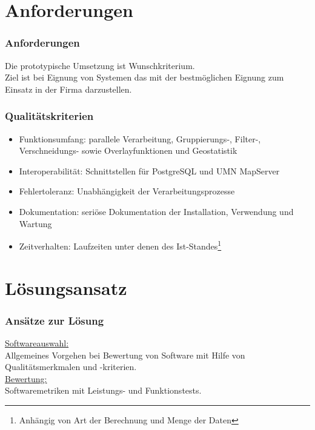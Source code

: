 \documentclass{beamer}
\begin{document}
% 

\section{Anforderungen}
\begin{frame}\frametitle{Anforderungen}
Die prototypische Umsetzung ist Wunschkriterium.\\ %
Ziel ist bei Eignung von Systemen das mit der bestmöglichen Eignung zum Einsatz in der Firma darzustellen.
\end{frame}

\begin{frame}\frametitle{Qualitätskriterien}
\begin{itemize}
\item Funktionsumfang: parallele Verarbeitung, Gruppierungs-, Filter-, Verschneidungs- sowie Overlayfunktionen und Geostatistik
\item Interoperabilität: Schnittstellen für PostgreSQL und UMN MapServer
\item Fehlertoleranz: Unabhängigkeit der Verarbeitungsprozesse
\item Dokumentation: seriöse Dokumentation der Installation, Verwendung und Wartung
\item Zeitverhalten: Laufzeiten unter denen des Ist-Standes\footnote{Anhängig von Art der Berechnung und Menge der Daten}
\end{itemize}
\end{frame}

\section{Lösungsansatz}


\begin{frame}\frametitle{Ansätze zur Lösung}
\underline{Softwareauswahl:}\\
Allgemeines Vorgehen bei Bewertung von Software mit Hilfe von Qualitätsmerkmalen und -kriterien.\\

\underline{Bewertung:}\\
Softwaremetriken mit Leistungs- und Funktionstests.
\end{frame}
% 
\end{document}
